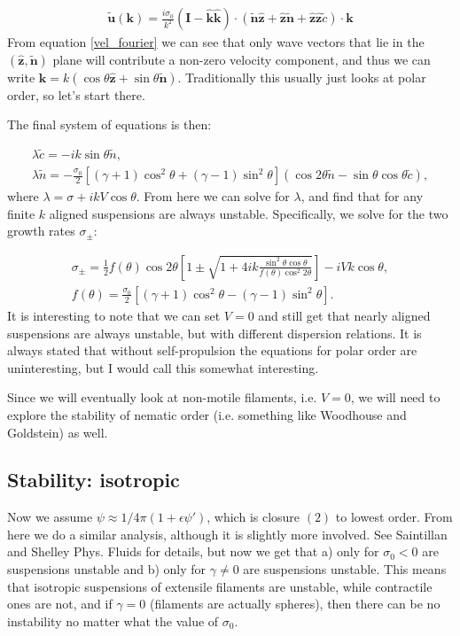 \documentclass[onecolumn,showpacs,preprintnumbers,prl,amsmath,amssymb]{revtex4-1}
\def\b{\mathbf}
\begin{document}
\begin{gather}
\label{vel_fourier}
\b{\tilde{u}}(\b{k})=\frac{i\sigma_0}{k^2}(\b{I}-\b{\hat{k}\hat{k}})\cdot(\b{\tilde{n}\hat{z}}+\b{\hat{z}\tilde{n}}+\b{\hat{z}\hat{z}}\tilde{c})\cdot\b{k}
\end{gather}
From equation \ref{vel_fourier} we can see that only wave vectors that lie in the $(\b{\hat{z}},\b{\tilde{n}})$ plane will contribute a non-zero velocity component, and thus we can write $\b{k}=k(\cos\theta\b{\hat{z}}+\sin\theta\b{\tilde{n}})$. Traditionally this usually just looks at polar order, so let's start there.

The final system of equations is then:

\begin{gather}
\lambda \tilde{c}=-i k\sin\theta \tilde{n},\\
\lambda \tilde{n}=-\frac{\sigma_0}{2}\left[(\gamma+1)\cos^2\theta+(\gamma-1)\sin^2\theta\right](\cos 2\theta \tilde{n}-\sin\theta\cos\theta \tilde{c}),
\end{gather}
where $\lambda=\sigma+ik V\cos\theta$. From here we can solve for $\lambda$, and find that for any finite $k$ aligned suspensions are always unstable. Specifically, we solve for the two growth rates $\sigma_{\pm}$:

\begin{gather}
\sigma_\pm=\frac{1}{2}f(\theta)\cos 2\theta\left[1\pm\sqrt{1+4ik\frac{\sin^2\theta\cos\theta}{f(\theta)\cos^2 2\theta}}\right]-i V k\cos\theta,\\
f(\theta)=\frac{\sigma_0}{2}[(\gamma+1)\cos^2\theta-(\gamma-1)\sin^2\theta].
\end{gather}
It is interesting to note that we can set $V=0$ and still get that nearly aligned suspensions are always unstable, but with different dispersion relations. It is always stated that without self-propulsion the equations for polar order are uninteresting, but I would call this somewhat interesting.

Since we will eventually look at non-motile filaments, i.e. $V=0$, we will need to explore the stability of nematic order (i.e. something like Woodhouse and Goldstein) as well.

\subsection{Stability: isotropic}

Now we assume $\psi\approx 1/4\pi(1+\epsilon\psi')$, which is closure $(2)$ to lowest order. From here we do a similar analysis, although it is slightly more involved. See Saintillan and Shelley Phys. Fluids for details, but now we get that a) only for $\sigma_0<0$ are suspensions unstable and b) only for $\gamma\neq 0$ are suspensions unstable. This means that isotropic suspensions of extensile filaments are unstable, while contractile ones are not, and if $\gamma=0$ (filaments are actually spheres), then there can be no instability no matter what the value of $\sigma_0$.
\end{document}

